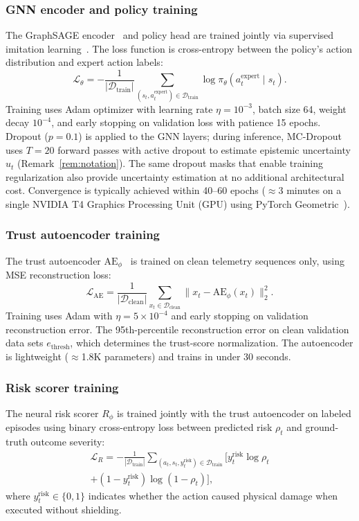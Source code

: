 \documentclass[10pt,journal,compsoc]{IEEEtran}
\begin{document}
\subsubsection{GNN encoder and policy training}
The GraphSAGE encoder~\cite{hamilton2017graphsage} and policy head are trained jointly via supervised imitation learning~\cite{hussein2017imitation}.
The loss function is cross-entropy between the policy's action distribution and expert action labels:
\[
\mathcal{L}_\theta = -\frac{1}{|\mathcal{D}_{\mathrm{train}}|}\sum_{(s_t, a_t^{\mathrm{expert}}) \in \mathcal{D}_{\mathrm{train}}} \log \pi_\theta(a_t^{\mathrm{expert}} \mid s_t).
\]
Training uses Adam optimizer with learning rate $\eta = 10^{-3}$, batch size 64, weight decay $10^{-4}$, and early stopping on validation loss with patience 15 epochs.
Dropout ($p = 0.1$) is applied to the GNN layers; during inference, MC-Dropout uses $T = 20$ forward passes with active dropout to estimate epistemic uncertainty $u_t$ (Remark~\ref{rem:notation}).
The same dropout masks that enable training regularization also provide uncertainty estimation at no additional architectural cost.
Convergence is typically achieved within 40--60 epochs ($\approx$3 minutes on a single NVIDIA T4 Graphics Processing Unit (GPU) using PyTorch Geometric~\cite{fey2019pyg}).

\subsubsection{Trust autoencoder training}
The trust autoencoder $\mathrm{AE}_\phi$~\cite{an2015variational,chalapathy2019deep} is trained on clean telemetry sequences only, using MSE reconstruction loss:
\[
\mathcal{L}_{\mathrm{AE}} = \frac{1}{|\mathcal{D}_{\mathrm{clean}}|}\sum_{x_t \in \mathcal{D}_{\mathrm{clean}}} \|x_t - \mathrm{AE}_\phi(x_t)\|_2^2.
\]
Training uses Adam with $\eta = 5 \times 10^{-4}$ and early stopping on validation reconstruction error.
The 95th-percentile reconstruction error on clean validation data sets $e_{\mathrm{thresh}}$, which determines the trust-score normalization.
The autoencoder is lightweight ($\approx$1.8K parameters) and trains in under 30 seconds.

\subsubsection{Risk scorer training}
The neural risk scorer $R_\phi$ is trained jointly with the trust autoencoder on labeled episodes using binary cross-entropy loss between predicted risk $\rho_t$ and ground-truth outcome severity:
\begin{multline*}
\mathcal{L}_R = -\frac{1}{|\mathcal{D}_{\mathrm{train}}|}\!\!\!\sum_{(a_t, s_t, y_t^{\mathrm{risk}}) \in \mathcal{D}_{\mathrm{train}}} \Big[y_t^{\mathrm{risk}} \log \rho_t \\
+ (1 - y_t^{\mathrm{risk}}) \log(1 - \rho_t)\Big],
\end{multline*}
where $y_t^{\mathrm{risk}} \in \{0, 1\}$ indicates whether the action caused physical damage when executed without shielding.
\end{document}
